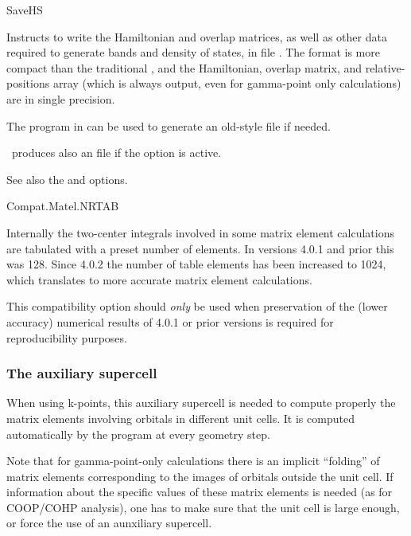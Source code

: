 \begin{fdflogicalF}{SaveHS}

  Instructs to write the Hamiltonian and overlap matrices, as well as
  other data required to generate bands and density of states, in file
  . The  format is more compact than the
  traditional , and the Hamiltonian, overlap matrix, and
  relative-positions array (which is always output, even for
  gamma-point only calculations) are in single precision.

  The program  in  can be used to
  generate an old-style  file if needed.

  \siesta\ produces also an  file if the  option
  is active.  


  See also the  and 
  options.

\end{fdflogicalF}

\begin{fdflogicalF}{Compat.Matel.NRTAB}

Internally the two-center integrals involved in some matrix element
calculations are tabulated with a preset number of elements. In
versions 4.0.1 and prior this was 128. Since 4.0.2 the number of table
elements has been increased to 1024, which translates to more accurate
matrix element calculations.

This compatibility option should \emph{only} be used when preservation
of the (lower accuracy) numerical results of 4.0.1 or prior versions
is required for reproducibility purposes.

\end{fdflogicalF}

\subsubsection{The auxiliary supercell}

When using k-points, this auxiliary supercell is needed to compute properly
the matrix elements involving orbitals in different unit cells.
It is computed automatically by the program at every geometry step.

Note that for gamma-point-only calculations there is an implicit
``folding'' of matrix elements corresponding to the images of orbitals
outside the unit cell. If information about the specific values of
these matrix elements is needed (as for COOP/COHP analysis), one has
to make sure that the unit cell is large enough, or force the use
of an aunxiliary supercell.
 
